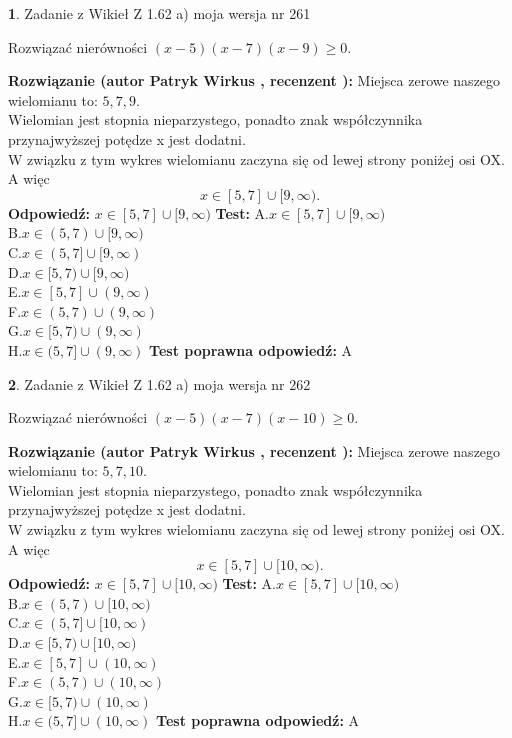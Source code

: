 \documentclass[12pt, a4paper]{article}
\theoremstyle{definition} %
\newtheorem{zad}{}
\newcommand{\zadStart}[1]{\begin{zad}#1\newline}
\newcommand{\zadStop}{\end{zad}}
\newcommand{\rozwStart}[2]{\noindent \textbf{Rozwiązanie (autor #1 , recenzent #2): }\newline}
\newcommand{\rozwStop}{\newline}
\newcommand{\odpStart}{\noindent \textbf{Odpowiedź:}\newline}
\newcommand{\odpStop}{\newline}
\newcommand{\testStart}{\noindent \textbf{Test:}\newline}
\newcommand{\testStop}{\newline}
\newcommand{\kluczStart}{\noindent \textbf{Test poprawna odpowiedź:}\newline}
\newcommand{\kluczStop}{\newline}
\begin{document}
\zadStart{Zadanie z Wikieł Z 1.62 a) moja wersja nr 261}

Rozwiązać nierówności $(x-5)(x-7)(x-9)\ge0$.
\zadStop
\rozwStart{Patryk Wirkus}{}
Miejsca zerowe naszego wielomianu to: $5, 7, 9$.\\
Wielomian jest stopnia nieparzystego, ponadto znak współczynnika przy\linebreak najwyższej potędze x jest dodatni.\\ W związku z tym wykres wielomianu zaczyna się od lewej strony poniżej osi OX. A więc $$x \in [5,7] \cup [9,\infty).$$
\rozwStop
\odpStart
$x \in [5,7] \cup [9,\infty)$
\odpStop
\testStart
A.$x \in [5,7] \cup [9,\infty)$\\
B.$x \in (5,7) \cup [9,\infty)$\\
C.$x \in (5,7] \cup [9,\infty)$\\
D.$x \in [5,7) \cup [9,\infty)$\\
E.$x \in [5,7] \cup (9,\infty)$\\
F.$x \in (5,7) \cup (9,\infty)$\\
G.$x \in [5,7) \cup (9,\infty)$\\
H.$x \in (5,7] \cup (9,\infty)$
\testStop
\kluczStart
A
\kluczStop



\zadStart{Zadanie z Wikieł Z 1.62 a) moja wersja nr 262}

Rozwiązać nierówności $(x-5)(x-7)(x-10)\ge0$.
\zadStop
\rozwStart{Patryk Wirkus}{}
Miejsca zerowe naszego wielomianu to: $5, 7, 10$.\\
Wielomian jest stopnia nieparzystego, ponadto znak współczynnika przy\linebreak najwyższej potędze x jest dodatni.\\ W związku z tym wykres wielomianu zaczyna się od lewej strony poniżej osi OX. A więc $$x \in [5,7] \cup [10,\infty).$$
\rozwStop
\odpStart
$x \in [5,7] \cup [10,\infty)$
\odpStop
\testStart
A.$x \in [5,7] \cup [10,\infty)$\\
B.$x \in (5,7) \cup [10,\infty)$\\
C.$x \in (5,7] \cup [10,\infty)$\\
D.$x \in [5,7) \cup [10,\infty)$\\
E.$x \in [5,7] \cup (10,\infty)$\\
F.$x \in (5,7) \cup (10,\infty)$\\
G.$x \in [5,7) \cup (10,\infty)$\\
H.$x \in (5,7] \cup (10,\infty)$
\testStop
\kluczStart
A
\kluczStop
\end{document}
